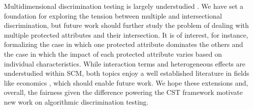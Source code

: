 Multidimensional discrimination testing is largely understudied \parencite{DBLP:conf/fat/0001HN23, WangRR22}. 
We have set a foundation for exploring the tension between multiple and intersectional discrimination, but future work should further study the problem of dealing with multiple protected attributes and their intersection.
It is of interest, for instance, formalizing the case in which one protected attribute dominates the others and the case in which the impact of each protected attribute varies based on individual characteristics.
While interaction terms and heterogeneous effects are understudied within SCM, both topics enjoy a well established literature in fields like economics \parencite{Wooldridge2015IntroductoryEconometrics}, which should enable future work.
% 
We hope these extensions and, overall, the fairness given the difference powering the CST framework motivate new work on algorithmic discrimination testing.

%
%
